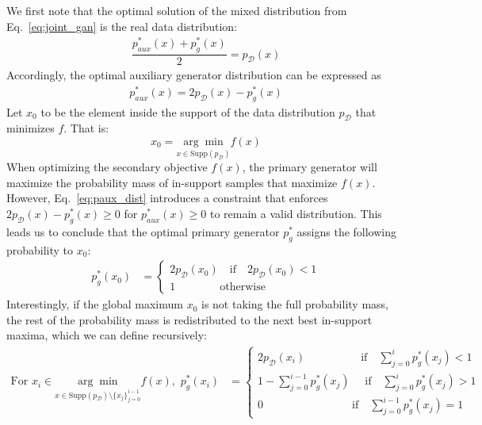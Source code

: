 We first note that the optimal solution of the mixed distribution from Eq.~\ref{eq:joint_gan} is the real data distribution:
\begin{align}
\dfrac{ p^*_{aux} (x) + p^*_{g} (x) }{2} = p_{\mathcal{D} } (x)
\label{eq:joint_match_real}
\end{align}
Accordingly, the optimal auxiliary generator distribution can be expressed as 
\begin{align}
    p^*_{aux} (x) = 2 p_{\mathcal{D}} (x) - p^*_g(x) \label{eq:paux_dist}
\end{align}
Let $x_0$ to be the element inside the support of the data distribution $p_{\mathcal{D}}$ that minimizes $f$. That is: $$ x_0 = \underset{x \in \text{Supp}( p_{\mathcal{D}} ) }{\arg\min} f(x) $$
When optimizing the secondary objective $f(x)$, the primary generator will maximize the probability mass of in-support samples that maximize $f(x)$. However, Eq.~\ref{eq:paux_dist} introduces a constraint that enforces $ 2 p_{\mathcal{D}} (x) - p^*_g(x) \geq 0$ for $p^*_{aux} (x) \geq 0$ to remain a valid distribution. This leads us to conclude that the optimal primary generator $p^*_g$ assigns the following probability to $x_0$:
\begin{align}
    p^*_{g} (x_0) & = \begin{cases}
    2p_{\mathcal{D}} (x_0) \quad  \text{if} \quad 2p_{\mathcal{D}} (x_0) < 1 \\
    1 \quad \quad  \quad \quad \text{otherwise}
    \end{cases}
\end{align}
Interestingly, if the global maximum $x_0$ is not taking the full probability mass, the rest of the probability mass is redistributed to the next best in-support maxima, which we can define recursively:
\begin{align}
         \text{For} \,\, x_i \in \underset{x \in \text{Supp}( p_{\mathcal{D}} )  \setminus \{ x_j \}_{j=0}^{i-1} }{\arg\min} f(x), \,\,
    p^*_{g} (x_i) & = \begin{cases}
      2p_{\mathcal{D}} (x_i)\quad \quad \quad \quad \quad \text{if} \quad \sum_{j=0}^i p^*_g(x_j) < 1 \\
      1 -  \sum_{j=0}^{i-1} p^*_g(x_j) \quad \,\, \text{if} \quad \sum_{j=0}^i p^*_g(x_j) > 1 \\ 
      0 \quad \quad \quad \quad \quad \quad \quad \quad  \text{if} \quad \sum_{j=0}^{i-1} p^*_g(x_j) = 1 
    \end{cases}
    \label{eq:sol_3_cases}
\end{align}

